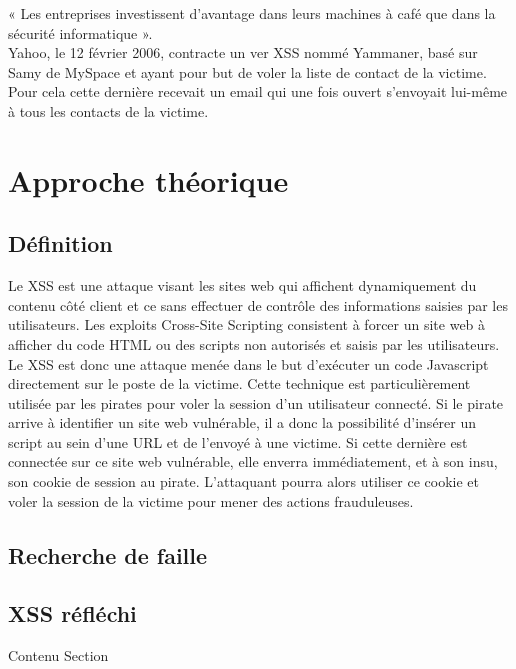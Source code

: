 \documentclass[a4paper,12pt]{report}
\begin{document}
« Les entreprises investissent d'avantage dans leurs machines à café que dans la sécurité informatique ».\\

Yahoo, le 12 février 2006, contracte un ver XSS nommé Yammaner, basé sur  Samy de MySpace et ayant pour but de voler la liste de contact de la victime. Pour cela cette dernière recevait un email qui une fois ouvert s’envoyait lui-même à tous les contacts de la victime.


		
			
		\newpage
	
	\chapter{Approche théorique} %
	\section{Définition}	
Le XSS est une attaque visant les sites web qui affichent dynamiquement du contenu côté client et ce sans effectuer de contrôle des informations saisies par les utilisateurs. Les exploits Cross-Site Scripting consistent à forcer un site web à afficher du code HTML ou des scripts non autorisés et saisis par les utilisateurs. Le XSS est donc une attaque menée dans le but d'exécuter un code Javascript directement sur le poste de la victime. Cette technique est particulièrement utilisée par les pirates pour voler la session d'un utilisateur connecté.
Si le pirate arrive à identifier un site web vulnérable, il a donc la possibilité d’insérer un script au sein d’une URL et de l’envoyé à une victime. Si cette dernière est connectée sur ce site web vulnérable, elle enverra immédiatement, et à son insu, son cookie de session au pirate. L'attaquant pourra alors utiliser ce cookie et voler la session de la victime pour mener des actions frauduleuses.

		

		\newpage
	

	\section{Recherche de faille}

		

		\newpage

	

	\section{XSS réfléchi}
		Contenu Section 
		
\end{document}
